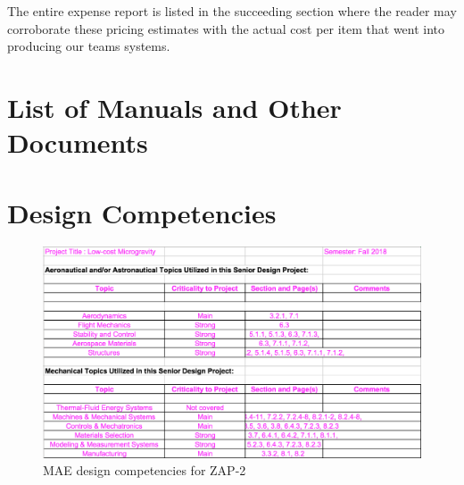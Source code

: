 The entire expense report is listed in the succeeding section where the reader may corroborate these pricing estimates with the actual cost per item that went into producing our teams systems. 






\section{List of Manuals and Other Documents}


\section{Design Competencies}

\begin{figure}[ht]
  \centering
  \includegraphics[width=1.0\textwidth]{Figures/DesignCompetence.png}
  \caption{\label{fig:DesignComp}MAE design competencies for ZAP-2}
\end{figure}

